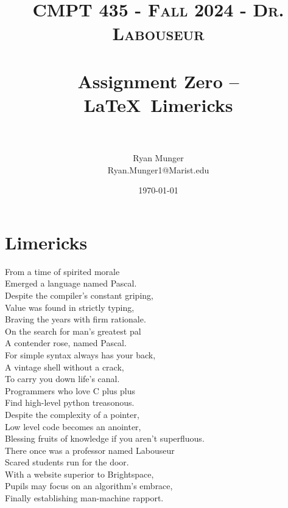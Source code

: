 \documentclass[letterpaper, 10pt]{article}
\title{	
   \normalfont \normalsize 
   \textsc{CMPT 435 - Fall 2024 - Dr. Labouseur} \\[10pt] %
   \horrule{0.5pt} \\[0.25cm] 	%
   \huge Assignment Zero -- \LaTeX ~Limericks \\     	    %
   \horrule{0.5pt} \\[0.25cm] 	%
}
\author{Ryan Munger \\ \normalsize Ryan.Munger1@Marist.edu}
\date{\normalsize\today} 	%
\begin{document}
\maketitle %



\section{Limericks}

\noindent
From a time of spirited morale \\
Emerged a language named Pascal. \\
    \hspace*{1.5em}Despite the compiler's constant griping, \\
    \hspace*{1.5em}Value was found in strictly typing, \\
Braving the years with firm rationale. \\

\noindent
On the search for man's greatest pal \\
A contender rose, named Pascal. \\
    \hspace*{1.5em}For simple syntax always has your back, \\
    \hspace*{1.5em}A vintage shell without a crack, \\
To carry you down life's canal. \\

\noindent
Programmers who love C plus plus \\
Find high-level python treasonous. \\
    \hspace*{1.5em}Despite the complexity of a pointer, \\
    \hspace*{1.5em}Low level code becomes an anointer, \\
Blessing fruits of knowledge if you aren't superfluous. \\

\noindent
There once was a professor named Labouseur \\
Scared students run for the door. \\
    \hspace*{1.5em}With a website superior to Brightspace, \\
    \hspace*{1.5em}Pupils may focus on an algorithm's embrace, \\
Finally establishing man-machine rapport. \\
\end{document}
